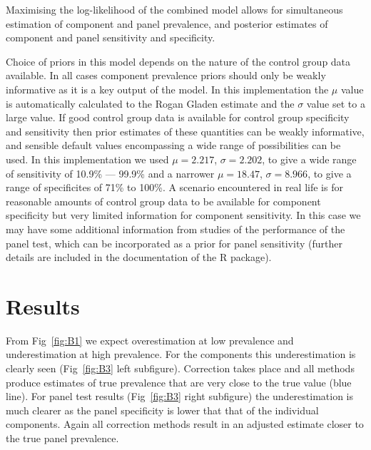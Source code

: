 \documentclass[a4paper, 12pt, twoside]{article}
\let\Oldsection\section
\renewcommand{\section}{\FloatBarrier\Oldsection}
\begin{document}
Maximising the log-likelihood of the combined model allows for simultaneous estimation of component and panel prevalence, and posterior estimates of component and panel sensitivity and specificity.

Choice of priors in this model depends on the nature of the control group data available. In all cases component prevalence priors should only be weakly informative as it is a key output of the model. In this implementation the \(\mu\) value is automatically calculated to the Rogan Gladen estimate and the \(\sigma\) value set to a large value. If good control group data is available for control group specificity and sensitivity then prior estimates of these quantities can be weakly informative, and sensible default values encompassing a wide range of possibilities can be used. In this implementation we used \(\mu=2.217\), \(\sigma=2.202\), to give a wide range of sensitivity of 10.9\% — 99.9\% and a narrower \(\mu=18.47\), \(\sigma=8.966\), to give a range of specificites of 71\% to 100\%. A scenario encountered in real life is for reasonable amounts of control group data to be available for component specificity but very limited information for component sensitivity. In this case we may have some additional information from studies of the performance of the panel test, which can be incorporated as a prior for panel sensitivity (further details are included in the documentation of the R package\cite{challen2023d}).

\section{Results}

From Fig~\ref{fig:B1} we expect overestimation at low prevalence and underestimation at high prevalence. For the components this underestimation is clearly seen (Fig~\ref{fig:B3} left subfigure). Correction takes place and all methods produce estimates of true prevalence that are very close to the true value (blue line). For panel test results (Fig~\ref{fig:B3} right subfigure) the underestimation is much clearer as the panel specificity is lower that that of the individual components. Again all correction methods result in an adjusted estimate closer to the true panel prevalence.
\end{document}
